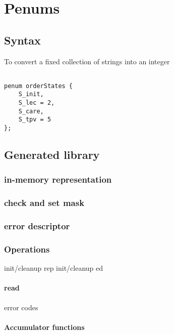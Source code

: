 \chapter{Penums}
\label{chap:enums}
\section{Syntax}
To convert a fixed collection of strings into an integer
\begin{verbatim}

penum orderStates {
    S_init,
    S_lec = 2,
    S_care,
    S_tpv = 5
};

\end{verbatim}


\section{Generated library}
\subsection{in-memory representation}
\subsection{check and set mask}
\subsection{error descriptor}
\subsection{Operations}
init/cleanup rep
init/cleanup ed
\subsubsection{read}
  error codes
\subsubsection{Accumulator functions}

